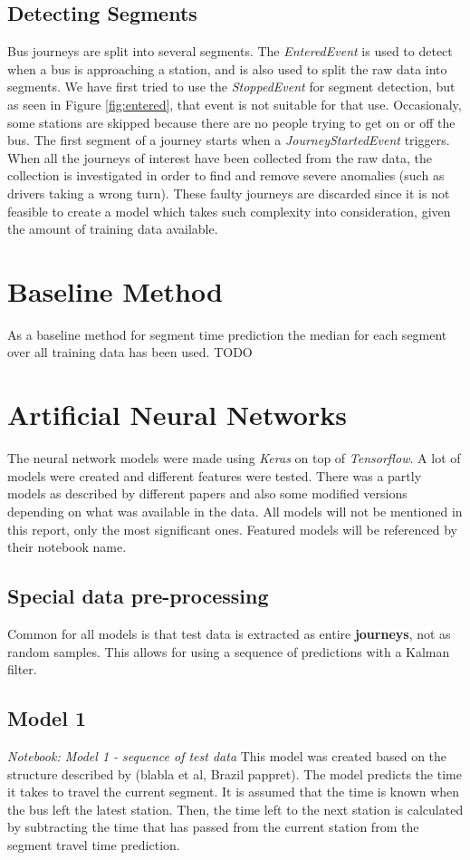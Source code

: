\subsection{Detecting Segments}
Bus journeys are split into several segments. The \textit{EnteredEvent} is used to detect when a bus is approaching a station, and is also used to split the raw data into segments.  We have first tried to use the \textit{StoppedEvent} for segment detection, but as seen in Figure \ref{fig:entered}, that event is not suitable for that use. Occasionaly, some stations are skipped because there are no people trying to get on or off the bus.
The first segment of a journey starts when a \textit{JourneyStartedEvent} triggers. When all the journeys of interest have been collected from the raw data, the collection is investigated in order to find and remove severe anomalies (such as drivers taking a wrong turn). These faulty journeys are discarded since it is not feasible to create a model which takes such complexity into consideration, given the amount of training data available.

\section{Baseline Method}
As a baseline method for segment time prediction the median for each segment over all training data has been used. TODO

\section{Artificial Neural Networks}
The neural network models were made using \textit{Keras} on top of \textit{Tensorflow}. A lot of models were created and different features were tested. There was a partly models as described by different papers and also some modified versions depending on what was available in the data.
All models will not be mentioned in this report, only the most significant ones. Featured models will be referenced by their notebook name.

\subsection{Special data pre-processing}
Common for all models is that test data is extracted as entire \textbf{journeys}, not as random samples. This allows for using a sequence of predictions with a Kalman filter.

\subsection{Model 1}\label{M1}
\textit{Notebook: Model 1 - sequence of test data}
\newline
\noindent This model was created based on the structure described by (blabla et al, Brazil pappret). The model predicts the time it takes to travel the current segment. It is assumed that the time is known when the bus left the latest station. Then, the time left to the next station is calculated by subtracting the time that has passed from the current station from the segment travel time prediction.

